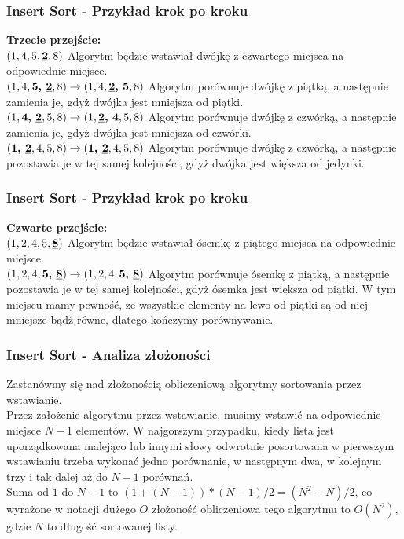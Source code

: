 \documentclass[kslide.tex]{subfiles}
\begin{document}
\begin{frame}
\frametitle{Insert Sort - Przykład krok po kroku}
\textbf{Trzecie przejście:}\\[0.1cm]
        $( 1, 4, 5, \textbf{\underline{2}}, 8 )$ Algorytm będzie wstawiał dwójkę z czwartego miejsca na odpowiednie miejsce.\\[0.1cm]
        $( 1, 4, \textbf{5, \underline{2}}, 8 ) \rightarrow ( 1, 4, \textbf{\underline{2}, 5}, 8 )$ Algorytm porównuje dwójkę z piątką, a następnie zamienia je, gdyż dwójka jest mniejsza od piątki.\\[0.1cm]
        $( 1, \textbf{4, \underline{2}}, 5, 8 ) \rightarrow ( 1, \textbf{\underline{2}, 4}, 5, 8 )$ Algorytm porównuje dwójkę z czwórką, a następnie zamienia je, gdyż dwójka jest mniejsza od czwórki.\\[0.1cm]
        $( \textbf{1, \underline{2}}, 4, 5, 8 ) \rightarrow ( \textbf{1, \underline{2}}, 4, 5, 8 )$ Algorytm porównuje dwójkę z czwórką, a następnie pozostawia je w tej samej kolejności, gdyż dwójka jest większa od jedynki.\\[0.1cm]
\end{frame}

\begin{frame}
\frametitle{Insert Sort - Przykład krok po kroku}
\textbf{Czwarte przejście:}\\[0.1cm]
        $( 1, 2, 4, 5, \textbf{\underline{8}} )$ Algorytm będzie wstawiał ósemkę z piątego miejsca na odpowiednie miejsce.\\[0.1cm]
        $( 1, 2, 4, \textbf{5, \underline{8}} ) \rightarrow ( 1, 2, 4, \textbf{5, \underline{8}} )$ Algorytm porównuje ósemkę z piątką, a następnie pozostawia je w tej samej kolejności, gdyż ósemka jest większa od piątki. W tym miejscu mamy pewność, ze wszystkie elementy na lewo od piątki są od niej mniejsze bądź równe, dlatego kończymy porównywanie.
\end{frame}

\begin{frame}
\frametitle{Insert Sort - Analiza złożoności}
    Zastanówmy się nad złożonością obliczeniową algorytmy sortowania przez wstawianie.\\[0.3cm]\pause
    Przez założenie algorytmu przez wstawianie, musimy wstawić na odpowiednie miejsce $N - 1$ elementów. W najgorszym przypadku, kiedy lista jest uporządkowana malejąco lub innymi słowy odwrotnie posortowana w pierwszym wstawianiu trzeba wykonać jedno porównanie, w następnym dwa, w kolejnym trzy i tak dalej aż do $N - 1$ porównań.\\[0.3cm]\pause
    Suma od $1$ do $N-1$ to $(1 + (N - 1))*(N -1) / 2 = (N^2-N)/2$, co wyrażone w notacji dużego $O$ złożoność obliczeniowa tego algorytmu to $O(N^2)$, gdzie $N$ to długość sortowanej listy.
\end{frame}
\end{document}
